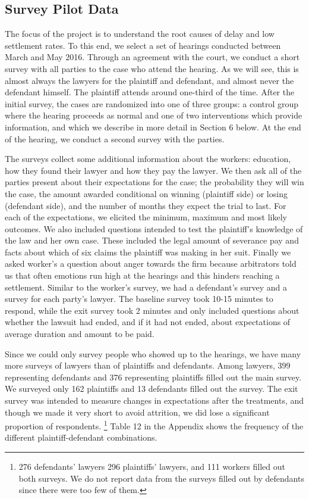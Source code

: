 \documentclass[11pt]{article}
\begin{document}
\subsection{Survey Pilot Data}

The focus of the project is to understand the root causes of delay and low settlement rates. To this end, we select a set of hearings conducted between March and May 2016.  Through an agreement with the court, we conduct a short survey with all parties to the case who attend the hearing. As we will see, this is almost always the lawyers for the plaintiff and defendant, and almost never the defendant himself. The plaintiff attends around one-third of the time. After the initial survey, the cases are randomized into one of three groups: a control group where the hearing proceeds as normal and one of two interventions which provide information, and which we describe in more detail in Section 6 below. At the end of the hearing, we conduct a second survey with the parties. 

The surveys collect some additional information about the workers: education, how they found their lawyer and how they pay the lawyer. We then ask all of the parties present about their expectations for the case; the probability they will win the case, the amount awarded conditional on winning (plaintiff side) or losing (defendant side), and the number of months they expect the trial to last. For each of the expectations, we elicited the minimum, maximum and most likely outcomes.  We also included questions intended to test the plaintiff’s knowledge of the law and her own case. These included the legal amount of severance pay and facts about which of six claims the plaintiff was making in her suit. Finally we asked worker’s a question about anger towards the firm because arbitrators told us that often emotions run high at the hearings and this hinders reaching a settlement. Similar to the worker’s survey, we had a defendant’s survey and a survey for each party’s lawyer. The baseline survey took 10-15 minutes to respond, while the exit survey took 2 minutes and only included questions about whether the lawsuit had ended, and if it had not ended, about expectations of average duration and amount to be paid.

Since we could only survey people who showed up to the hearings, we have many more
surveys of lawyers than of plaintiffs and defendants. Among lawyers, 399 representing defendants and 376 representing plaintiffs filled out the main survey. We surveyed only 162 plaintiffs and 13 defendants filled out the survey. The exit survey was intended to measure changes in expectations after the treatments, and though we made it very short to avoid attrition, we did lose a significant proportion of respondents. \footnote{276 defendants’ lawyers 296 plaintiffs’ lawyers, and 111 workers filled out both surveys. We do not report data from the surveys filled out by defendants since there were too few of them.} Table 12 in the Appendix shows the frequency of the different plaintiff-defendant combinations. 
\end{document}
